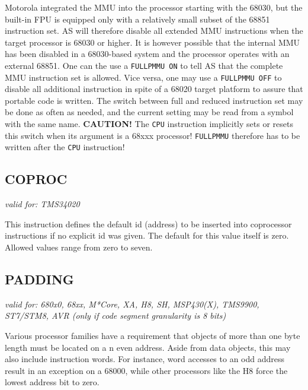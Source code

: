 \documentclass[12pt,twoside]{report}
\makeatletter
\newcommand{\bb}[1]{{\bf #1}}
\newcommand{\tty}[1]{{\tt #1}}
\newcommand{\ttindex}[1]{\index{#1@{\tt #1}}}
\newcommand{\asname}{{AS}}
\makeatother
\begin{document}
Motorola integrated the MMU into the processor starting with the 68030, but
the built-in FPU is equipped only with a relatively small subset of the
68851 instruction set.  \asname{} will therefore disable all extended MMU
instructions when the target processor is 68030 or higher.  It is however
possible that the internal MMU has been disabled in a 68030-based system
and the processor operates with an external 68851.  One can the use a
\tty{FULLPMMU ON} to tell \asname{} that the complete MMU instruction set is
allowed.  Vice versa, one may use a \tty{FULLPMMU OFF} to disable all
additional instruction in spite of a 68020 target platform to assure that
portable code is written.  The switch between full and reduced instruction
set may be done as often as needed, and the current setting may be read
from a symbol with the same name.  \bb{CAUTION!} The \tty{CPU} instruction
implicitly sets or resets this switch when its argument is a 68xxx
processor!  \tty{FULLPMMU} therefore has to be written after the \tty{CPU}
instruction!


\subsection{COPROC}
\ttindex{COPROC}

{\em valid for: TMS34020}

This instruction defines the default id (address) to be inserted into
coprocessor instructions if no explicit id was given.  The default for this
value itself is zero.  Allowed values range from zero to seven.


\subsection{PADDING}
\ttindex{PADDING}

{\em valid for: 680x0, 68xx, M*Core, XA, H8, SH, MSP430(X), TMS9900,\\
      ST7/STM8, AVR (only if code segment granularity is 8 bits)}

Various processor families have a requirement that objects of more than
one byte length must be located on a n even address.  Aside from data
objects, this may also include instruction words.  For instance, word
accesses to an odd address result in an exception on a 68000, while other
processors like the H8 force the lowest address bit to zero.
\end{document}
